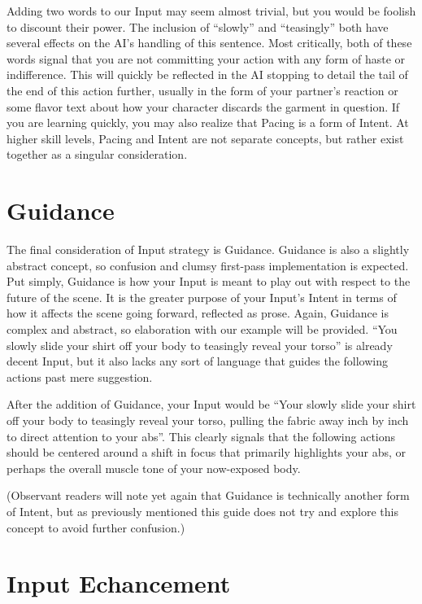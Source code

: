 \documentclass[Coomer-main.tex]{subfiles}
\begin{document}
Adding two words to our Input may seem almost trivial, but you would be foolish to discount their power.
The inclusion of “slowly” and “teasingly” both have several effects on the AI’s handling of this sentence.
Most critically, both of these words signal that you are not committing your action with any form of haste or indifference.
This will quickly be reflected in the AI stopping to detail the tail of the end of this action further, usually in the form of your partner’s reaction or some flavor text about how your character discards the garment in question.
If you are learning quickly, you may also realize that Pacing is a form of Intent.
At higher skill levels, Pacing and Intent are not separate concepts, but rather exist together as a singular consideration.

\section{Guidance}

The final consideration of Input strategy is Guidance.
Guidance is also a slightly abstract concept, so confusion and clumsy first-pass implementation is expected.
Put simply, Guidance is how your Input is meant to play out with respect to the future of the scene.
It is the greater purpose of your Input’s Intent in terms of how it affects the scene going forward, reflected as prose.
Again, Guidance is complex and abstract, so elaboration with our example will be provided.
“You slowly slide your shirt off your body to teasingly reveal your torso” is already decent Input, but it also lacks any sort of language that guides the following actions past mere suggestion.

After the addition of Guidance, your Input would be “Your slowly slide your shirt off your body to teasingly reveal your torso, pulling the fabric away inch by inch to direct attention to your abs”.
This clearly signals that the following actions should be centered around a shift in focus that primarily highlights your abs, or perhaps the overall muscle tone of your now-exposed body.

(Observant readers will note yet again that Guidance is technically another form of Intent, but as previously mentioned this guide does not try and explore this concept to avoid further confusion.)

\section{Input Echancement}
\end{document}
